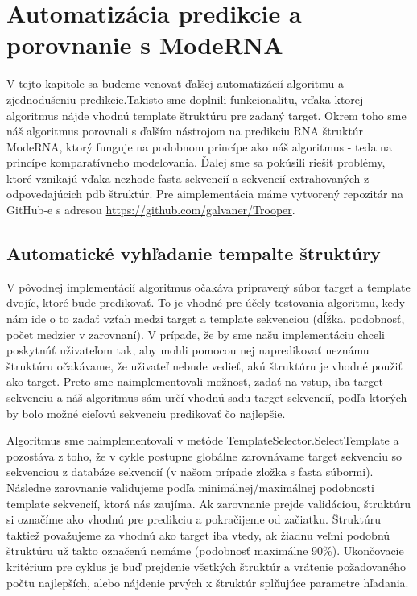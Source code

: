 \chapter{Automatizácia predikcie a porovnanie s ModeRNA}

V tejto kapitole sa budeme venovať ďalšej automatizácií algoritmu a zjednodušeniu predikcie.Takisto sme doplnili funkcionalitu, vďaka ktorej algoritmus nájde vhodnú template štruktúru pre zadaný target. Okrem toho sme náš algoritmus porovnali s ďalším nástrojom na predikciu RNA štruktúr ModeRNA, ktorý funguje na podobnom princípe ako náš algoritmus - teda na princípe komparatívneho modelovania. Ďalej sme sa pokúsili riešiť problémy, ktoré vznikajú vďaka nezhode fasta sekvencií a sekvencií extrahovaných z odpovedajúcich pdb štruktúr. Pre aimplementácia máme vytvorený repozitár na GitHub-e s adresou \url{https://github.com/galvaner/Trooper}.

\section{Automatické vyhľadanie tempalte štruktúry}
V pôvodnej implementácií  algoritmus očakáva pripravený súbor target a template dvojíc, ktoré bude predikovať. To je vhodné pre účely testovania algoritmu, kedy nám ide o to zadať vzťah medzi target a template sekvenciou (dĺžka, podobnosť, počet medzier v zarovnaní). V prípade, že by sme našu implementáciu chceli poskytnúť uživateľom tak, aby mohli pomocou nej napredikovať  neznámu štruktúru očakávame, že uživateľ nebude vedieť, akú štruktúru je vhodné použiť ako target. Preto sme naimplementovali možnosť, zadať na vstup, iba target sekvenciu a náš algoritmus sám určí vhodnú sadu target sekvencií, podľa ktorých by bolo možné cieľovú sekvenciu predikovať čo najlepšie.


\indent Algoritmus sme naimplementovali v metóde TemplateSelector.SelectTemplate a pozostáva z toho, že v cykle postupne globálne zarovnávame target sekvenciu so sekvenciou z databáze sekvencií (v našom prípade zložka s fasta súbormi). Následne  zarovnanie validujeme podľa minimálnej/maximálnej podobnosti template sekvencií, ktorá nás zaujíma. Ak zarovnanie prejde validáciou, štruktúru si označíme ako vhodnú pre predikciu a pokračijeme od začiatku. Štruktúru taktiež považujeme za vhodnú ako target iba vtedy, ak  žiadnu veľmi podobnú štruktúru už takto označenú nemáme (podobnosť maximálne 90\%). Ukončovacie kritérium pre cyklus je buď prejdenie všetkých štruktúr a vrátenie požadovaného počtu najlepších, alebo nájdenie prvých x štruktúr splňujúce parametre hľadania.


